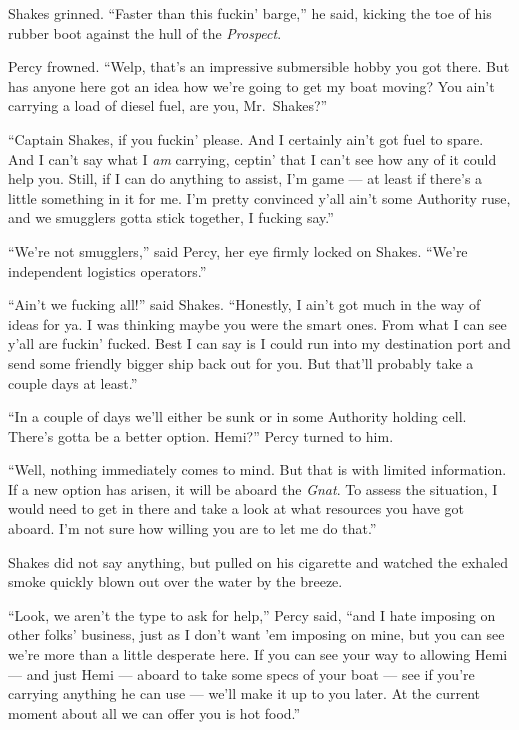 \documentclass[
]{scrbook}
\begin{document}
Shakes grinned. ``Faster than this fuckin' barge,'' he said, kicking the
toe of his rubber boot against the hull of the \emph{Prospect}.

Percy frowned. ``Welp, that's an impressive submersible hobby you got
there. But has anyone here got an idea how we're going to get my boat
moving? You ain't carrying a load of diesel fuel, are you, Mr.~Shakes?''

``Captain Shakes, if you fuckin' please. And I certainly ain't got fuel
to spare. And I can't say what I \emph{am} carrying, ceptin' that I
can't see how any of it could help you. Still, if I can do anything to
assist, I'm game --- at least if there's a little something in it for
me. I'm pretty convinced y'all ain't some Authority ruse, and we
smugglers gotta stick together, I fucking say.''

``We're not smugglers,'' said Percy, her eye firmly locked on Shakes.
``We're independent logistics operators.''

``Ain't we fucking all!'' said Shakes. ``Honestly, I ain't got much in
the way of ideas for ya. I was thinking maybe you were the smart ones.
From what I can see y'all are fuckin' fucked. Best I can say is I could
run into my destination port and send some friendly bigger ship back out
for you. But that'll probably take a couple days at least.''

``In a couple of days we'll either be sunk or in some Authority holding
cell. There's gotta be a better option. Hemi?'' Percy turned to him.

``Well, nothing immediately comes to mind. But that is with limited
information. If a new option has arisen, it will be aboard the
\emph{Gnat}. To assess the situation, I would need to get in there and
take a look at what resources you have got aboard. I'm not sure how
willing you are to let me do that.''

Shakes did not say anything, but pulled on his cigarette and watched the
exhaled smoke quickly blown out over the water by the breeze.

``Look, we aren't the type to ask for help,'' Percy said, ``and I hate
imposing on other folks' business, just as I don't want 'em imposing on
mine, but you can see we're more than a little desperate here. If you
can see your way to allowing Hemi --- and just Hemi --- aboard to take
some specs of your boat --- see if you're carrying anything he can use
--- we'll make it up to you later. At the current moment about all we
can offer you is hot food.''
\end{document}
